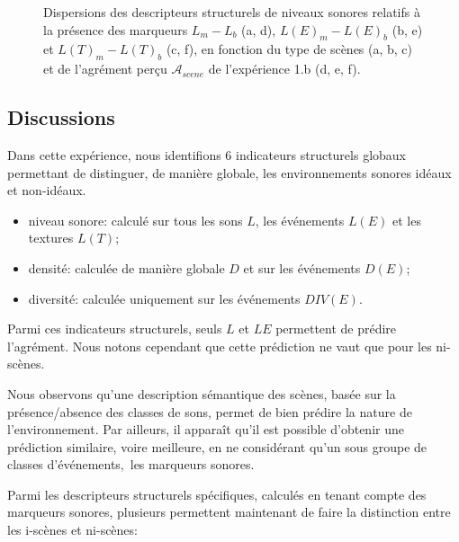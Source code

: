 \begin{figure}[t]
       \caption{Dispersions des descripteurs structurels de niveaux sonores relatifs à la présence des marqueurs $L_m-L_b$ (a, d), $L(E)_m-L(E)_b$ (b, e) et $L(T)_m-L(T)_b$ (c, f), en fonction du type de scènes (a, b, c) et de l'agrément perçu $\mathcal{A}_{scene}$ de l'expérience 1.b (d, e, f).}\label{fig:soundlevelMarkerDiff}
\end{figure}

\subsection{Discussions}

Dans cette expérience, nous identifions 6 indicateurs structurels globaux permettant de distinguer, de manière globale, les environnements sonores idéaux et non-idéaux.

\begin{itemize}
\item niveau sonore: calculé sur tous les sons $L$, les événements $L(E)$ et les textures $L(T)$; 
\item densité: calculée de manière globale $D$ et sur les événements $D(E)$;
\item diversité: calculée uniquement sur les événements $DIV(E)$.
\end{itemize}

Parmi ces indicateurs structurels, seuls $L$ et $LE$ permettent de prédire l'agrément. Nous notons cependant que cette prédiction ne vaut que pour les ni-scènes. 

Nous observons qu'une description sémantique des scènes, basée sur la présence/absence des classes de sons, permet de bien prédire la nature de l'environnement. Par ailleurs, il apparaît qu'il est possible d'obtenir une prédiction similaire, voire meilleure, en ne considérant qu'un sous groupe de classes d'événements,\ie~les marqueurs sonores.

Parmi les descripteurs structurels spécifiques, calculés en tenant compte des marqueurs sonores, plusieurs permettent maintenant de faire la distinction entre les i-scènes et ni-scènes:


